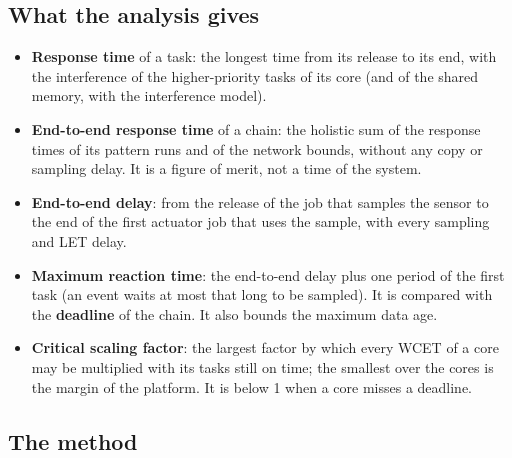 \subsection{What the analysis gives}
\label{sec:concepts-metrics}

\begin{itemize}
\item \textbf{Response time} of a task: the longest time from its release
to its end, with the interference of the higher-priority tasks of its core
(and of the shared memory, with the interference model).
\item \textbf{End-to-end response time} of a chain: the holistic sum of the
response times of its pattern runs and of the network bounds, without any
copy or sampling delay. It is a figure of merit, not a time of the system.
\item \textbf{End-to-end delay}: from the release of the job that samples
the sensor to the end of the first actuator job that uses the sample,
with every sampling and LET delay.
\item \textbf{Maximum reaction time}: the end-to-end delay plus one period
of the first task (an event waits at most that long to be sampled). It is
compared with the \textbf{deadline} of the chain. It also bounds the
maximum data age.
\item \textbf{Critical scaling factor}: the largest factor by which every
WCET of a core may be multiplied with its tasks still on time; the
smallest over the cores is the margin of the platform. It is below 1 when
a core misses a deadline.
\end{itemize}

\subsection{The method}
\label{sec:concepts-method}

